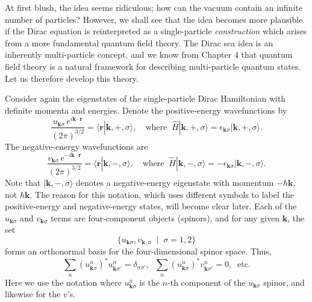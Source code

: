 \documentclass[pra,12pt]{revtex4}
\begin{document}
At first blush, the idea seems ridiculous; how can the vacuum contain
an infinite number of particles?  However, we shall see that the idea
becomes more plausible if the Dirac equation is reinterpreted as a
single-particle \textit{construction} which arises from a more
fundamental quantum field theory.  The Dirac sea idea is an inherently
multi-particle concept, and we know from Chapter 4 that quantum field
theory is a natural framework for describing multi-particle quantum
states.  Let us therefore develop this theory.

Consider again the eigenstates of the single-particle Dirac
Hamiltonian with definite momenta and energies.  Denote the
positive-energy wavefunctions by
\begin{equation}
  \frac{u_{\mathbf{k}\sigma} \, e^{i\mathbf{k}\cdot \mathbf{r}}}{(2\pi)^{3/2}}
  = \langle \mathbf{r} | \mathbf{k}, +, \sigma\rangle,
  \quad\mathrm{where}\;\;
  \hat{H} |\mathbf{k}, +, \sigma\rangle
  = \epsilon_{\mathbf{k}\sigma} |\mathbf{k}, +, \sigma\rangle.
  \label{Diraces1}
\end{equation}
The negative-energy wavefunctions are
\begin{equation}
  \frac{v_{\mathbf{k}\sigma} \, e^{-i\mathbf{k}\cdot \mathbf{r}}}{(2\pi)^{3/2}}
  = \langle \mathbf{r} | \mathbf{k}, -, \sigma\rangle,
  \quad\mathrm{where}\;\;
  \hat{H} |\mathbf{k}, -, \sigma\rangle
  = - \epsilon_{\mathbf{k}\sigma} |\mathbf{k}, -, \sigma\rangle.
  \label{Diraces2}
\end{equation}
Note that $|\mathbf{k}, -, \sigma\rangle$ denotes a negative-energy
eigenstate with momentum $-\hbar\mathbf{k}$, not $\hbar\mathbf{k}$.
The reason for this notation, which uses different symbols to label
the positive-energy and negative-energy states, will become clear
later.  Each of the $u_{\mathbf{k}\sigma}$ and $v_{\mathbf{k}\sigma}$
terms are four-component objects (spinors), and for any given
$\mathbf{k}$, the set
\begin{equation*}
  \{ u_{\mathbf{k}\sigma}, v_{\mathbf{k},\sigma}\;\;  | \;\; \sigma = 1,2  \}
\end{equation*}
forms an orthonormal basis for the four-dimensional spinor space.
Thus,
\begin{equation}
  \sum_{n} \left(u^n_{\mathbf{k}\sigma}\right)^* u^n_{\mathbf{k}\sigma'} = \delta_{\sigma\sigma'}, \;\;
  \sum_{n} \left(u^n_{\mathbf{k}\sigma}\right)^* v^n_{\mathbf{k}\sigma'} = 0, \;\;
  \textrm{etc.}
  \label{uvorthog}
\end{equation}
Here we use the notation where $u^n_{\mathbf{k}\sigma}$ is the $n$-th
component of the $u_{\mathbf{k}\sigma}$ spinor, and likewise for the
$v$'s.
\end{document}

